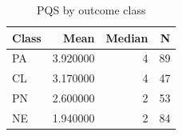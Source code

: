 \begin{table}
\caption{PQS by outcome class}
\label{tab:pqs-by-outcome}
\begin{tabular}{lrrr}
\toprule
Class & Mean & Median & N \\
\midrule
PA & 3.920000 & 4 & 89 \\
CL & 3.170000 & 4 & 47 \\
PN & 2.600000 & 2 & 53 \\
NE & 1.940000 & 2 & 84 \\
\bottomrule
\end{tabular}
\end{table}
